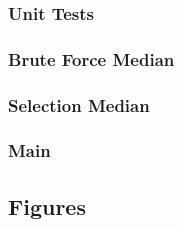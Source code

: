 \documentclass{article}
\begin{document}
        \subsubsection{Unit Tests}
            

        \subsubsection{Brute Force Median}
            

        \subsubsection{Selection Median}
            

        \subsubsection{Main}
            

    \subsection{Figures}
\end{document}
